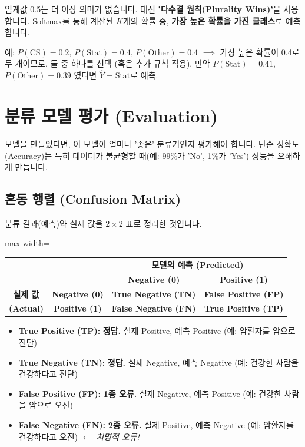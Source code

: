 \documentclass[11pt,a4paper]{book}
\theoremstyle{definition}
\begin{document}
임계값 0.5는 더 이상 의미가 없습니다.
대신 \textbf{'다수결 원칙(Plurality Wins)'}을 사용합니다.
Softmax를 통해 계산된 $K$개의 확률 중, \textbf{가장 높은 확률을 가진 클래스}로 예측합니다.

예: $P(\text{CS})=0.2$, $P(\text{Stat})=0.4$, $P(\text{Other})=0.4$
$\implies$ 가장 높은 확률이 0.4로 두 개이므로, 둘 중 하나를 선택 (혹은 추가 규칙 적용).
만약 $P(\text{Stat})=0.41$, $P(\text{Other})=0.39$ 였다면 $\hat{Y} = \text{Stat}$로 예측.


\section{분류 모델 평가 (Evaluation)}

모델을 만들었다면, 이 모델이 얼마나 '좋은' 분류기인지 평가해야 합니다.
단순 정확도(Accuracy)는 특히 데이터가 불균형할 때(예: 99\%가 'No', 1\%가 'Yes') 성능을 오해하게 만듭니다.

\subsection{혼동 행렬 (Confusion Matrix)}

분류 결과(예측)와 실제 값을 $2 \times 2$ 표로 정리한 것입니다.

\begin{center}
\begin{adjustbox}{max width=\textwidth}
\begin{tabular}{cc|cc}
\multicolumn{2}{c}{} & \multicolumn{2}{c}{\textbf{모델의 예측 (Predicted)}} \\
\multicolumn{2}{c}{} & \textbf{Negative (0)} & \textbf{Positive (1)} \\ \hline
\textbf{실제 값} & \textbf{Negative (0)} & \textbf{True Negative (TN)} & \textbf{False Positive (FP)} \\
\textbf{(Actual)} & \textbf{Positive (1)} & \textbf{False Negative (FN)} & \textbf{True Positive (TP)} \\
\end{tabular}
\end{adjustbox}
\end{center}

\begin{itemize}
  \item \textbf{True Positive (TP):} \textbf{정답.} 실제 Positive, 예측 Positive (예: 암환자를 암으로 진단)
  \item \textbf{True Negative (TN):} \textbf{정답.} 실제 Negative, 예측 Negative (예: 건강한 사람을 건강하다고 진단)
  \item \textbf{False Positive (FP):} \textbf{1종 오류.} 실제 Negative, 예측 Positive (예: 건강한 사람을 암으로 오진)
  \item \textbf{False Negative (FN):} \textbf{2종 오류.} 실제 Positive, 예측 Negative (예: 암환자를 건강하다고 오진) $\leftarrow$ \textit{치명적 오류!}
\end{itemize}
\end{document}
